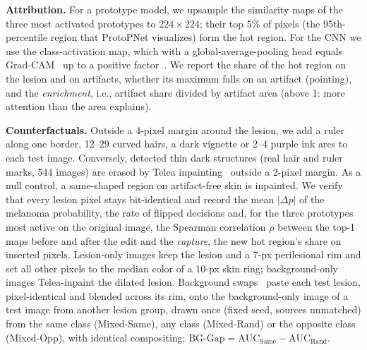 \documentclass[conference]{IEEEtran}
\begin{document}
\textbf{Attribution.} For a prototype model, we upsample the similarity maps of the three most activated prototypes to $224\times224$; their top 5\% of pixels (the 95th-percentile region that ProtoPNet visualizes) form the hot region. For the CNN we use the class-activation map, which with a global-average-pooling head equals Grad-CAM~\cite{selvaraju2017} up to a positive factor~\cite{zhou2016}. We report the share of the hot region on the lesion and on artifacts, whether its maximum falls on an artifact (pointing), and the \emph{enrichment}, i.e., artifact share divided by artifact area (above 1: more attention than the area explains).

\textbf{Counterfactuals.} Outside a 4-pixel margin around the lesion, we add a ruler along one border, 12--29 curved hairs, a dark vignette or 2--4 purple ink arcs to each test image. Conversely, detected thin dark structures (real hair and ruler marks, 544 images) are erased by Telea inpainting~\cite{telea2004} outside a 2-pixel margin. As a null control, a same-shaped region on artifact-free skin is inpainted. We verify that every lesion pixel stays bit-identical and record the mean $|\Delta p|$ of the melanoma probability, the rate of flipped decisions and, for the three prototypes most active on the original image, the Spearman correlation $\rho$ between the top-1 maps before and after the edit and the \emph{capture}, the new hot region's share on inserted pixels. Lesion-only images keep the lesion and a 7-px perilesional rim and set all other pixels to the median color of a 10-px skin ring; background-only images Telea-inpaint the dilated lesion. Background swaps~\cite{xiao2021} paste each test lesion, pixel-identical and blended across its rim, onto the background-only image of a test image from another lesion group, drawn once (fixed seed, sources unmatched) from the same class (Mixed-Same), any class (Mixed-Rand) or the opposite class (Mixed-Opp), with identical compositing; $\text{BG-Gap}=\mathrm{AUC}_\text{Same}-\mathrm{AUC}_\text{Rand}$.
\end{document}
